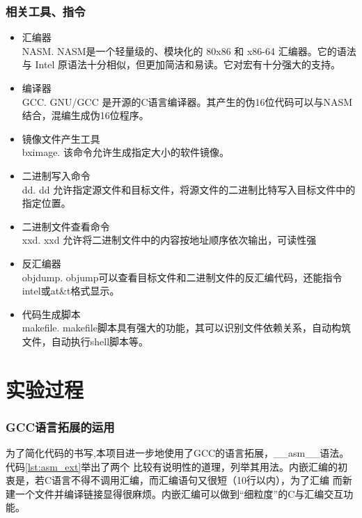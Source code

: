 \documentclass[a4paper]{article}
\begin{document}
    \subsubsection{相关工具、指令}
        \begin{itemize}
            \item 汇编器\\ 
            NASM. NASM是一个轻量级的、模块化的 80x86 和 x86-64 汇编器。它的语法与
            Intel 原语法十分相似，但更加简洁和易读。它对宏有十分强大的支持。
            \item 编译器\\
            GCC. GNU/GCC 是开源的C语言编译器。其产生的伪16位代码可以与NASM结合，混编生成伪16位程序。
            \item 镜像文件产生工具\\ 
            bximage. 该命令允许生成指定大小的软件镜像。
            \item 二进制写入命令\\ 
            dd. dd 允许指定源文件和目标文件，将源文件的二进制比特写入目标文件中的指定位置。
            \item 二进制文件查看命令\\ 
            xxd. xxd 允许将二进制文件中的内容按地址顺序依次输出，可读性强
            \item 反汇编器\\
            objdump. objump可以查看目标文件和二进制文件的反汇编代码，还能指令intel或at\&t格式显示。
            \item 代码生成脚本\\
            makefile. makefile脚本具有强大的功能，其可以识别文件依赖关系，自动构筑文件，自动执行shell脚本等。
        \end{itemize}
 
\section{实验过程}
    \subsubsection{GCC语言拓展的运用}\label{subsec:asm}
    为了简化代码的书写,本项目进一步地使用了GCC的语言拓展，\_\_asm\_\_语法。代码\ref{lst:asm_ext}举出了两个
    比较有说明性的道理，列举其用法。内嵌汇编的初衷是，若C语言不得不调用汇编，而汇编语句又很短（10行以内），为了汇编
    而新建一个文件并编译链接显得很麻烦。内嵌汇编可以做到``细粒度''的C与汇编交互功能。\\
    
\end{document}
